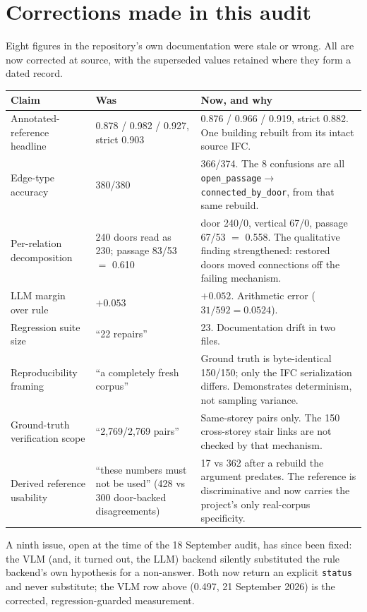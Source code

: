 \documentclass[11pt,a4paper]{article}
\newcommand{\code}[1]{\texttt{\small #1}}
\begin{document}
\section{Corrections made in this audit}

Eight figures in the repository's own documentation were stale or wrong. All are
now corrected at source, with the superseded values retained where they form a
dated record.

\begin{longtable}{p{}p{}p{}}
\toprule
Claim & Was & Now, and why \\
\midrule
\endhead
Annotated-reference headline & 0.878 / 0.982 / 0.927, strict 0.903 &
0.876 / 0.966 / 0.919, strict 0.882. One building rebuilt from its intact
source IFC. \\
Edge-type accuracy & 380/380 & 366/374. The 8 confusions are all
\code{open\_passage}$\to$\code{connected\_by\_door}, from that same rebuild. \\
Per-relation decomposition & 240 doors read as 230; passage 83/53 $=$ 0.610 &
door 240/0, vertical 67/0, passage 67/53 $=$ 0.558. The qualitative finding
strengthened: restored doors moved connections off the failing mechanism. \\
LLM margin over rule & $+0.053$ & $+0.052$. Arithmetic error
($31/592 = 0.0524$). \\
Regression suite size & ``22 repairs'' & 23. Documentation drift in two files. \\
Reproducibility framing & ``a completely fresh corpus'' & Ground truth is
byte-identical 150/150; only the IFC serialization differs. Demonstrates
determinism, not sampling variance. \\
Ground-truth verification scope & ``2{,}769/2{,}769 pairs'' &
Same-storey pairs only. The 150 cross-storey stair links are not checked by
that mechanism. \\
Derived reference usability & ``these numbers must not be used'' (428 vs 300
door-backed disagreements) & 17 vs 362 after a rebuild the argument predates.
The reference is discriminative and now carries the project's only real-corpus
specificity. \\
\bottomrule
\end{longtable}

\noindent
A ninth issue, open at the time of the 18 September audit, has since been
fixed: the VLM (and, it turned out, the LLM) backend silently substituted the
rule backend's own hypothesis for a non-answer. Both now return an explicit
\code{status} and never substitute; the VLM row above (0.497, 21 September
2026) is the corrected, regression-guarded measurement.
\end{document}
